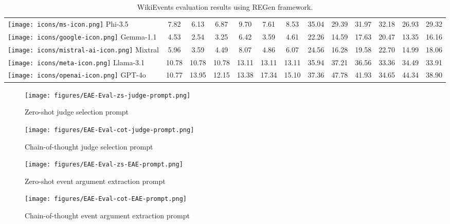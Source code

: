 \begin{table*}[h!]
\begin{tabular}{l|ccc|ccc|ccc|ccc}
\texttt{[image: icons/ms-icon.png]} Phi-3.5 & 7.82 & 6.13 & 6.87 & 9.70 & 7.61 & 8.53 & 35.04 & 29.39 & 31.97 & 32.18 & 26.93 & 29.32 \\
\texttt{[image: icons/google-icon.png]} Gemma-1.1 & 4.53 & 2.54 & 3.25 & 6.42 & 3.59 & 4.61 & 22.26 & 14.59 & 17.63 & 20.47 & 13.35 & 16.16 \\
\texttt{[image: icons/mistral-ai-icon.png]} Mixtral & 5.96 & 3.59 & 4.49 & 8.07 & 4.86 & 6.07 & 24.56 & 16.28 & 19.58 & 22.70  & 14.99 & 18.06 \\
\texttt{[image: icons/meta-icon.png]} Llama-3.1 & 10.78 & 10.78 & 10.78 & 13.11 & 13.11 & 13.11 & 35.94 & 37.21 & 36.56 & 33.36 & 34.49 & 33.91\\
\texttt{[image: icons/openai-icon.png]} GPT-4o & 10.77 & 13.95 & 12.15 & 13.38 & 17.34 & 15.10 & 37.36 & 47.78 & 41.93 & 34.65 & 44.34 & 38.90 \\

\bottomrule 
\end{tabular}
\caption{WikiEvents evaluation results using REGen framework.}
\label{WikiEvents-all-results}
\end{table*}


\begin{figure}[h!]
  \centering
  \texttt{[image: figures/EAE-Eval-zs-judge-prompt.png]}
 \caption{Zero-shot judge selection prompt}
 \label{zs-judge-prompt}
\end{figure}

\begin{figure}[t!]
  \centering
  \texttt{[image: figures/EAE-Eval-cot-judge-prompt.png]}
 \caption{Chain-of-thought judge selection prompt}
 \label{cot-judge-prompt}
\end{figure}


\begin{figure}[t!]
  \centering
  \texttt{[image: figures/EAE-Eval-zs-EAE-prompt.png]}
 \caption{Zero-shot event argument extraction prompt}
 \label{zs-EAE-prompt}
\end{figure}

\begin{figure}[t!]
  \centering
  \texttt{[image: figures/EAE-Eval-cot-EAE-prompt.png]}
 \caption{Chain-of-thought event argument extraction prompt}
 \label{cot-EAE-prompt}
\end{figure}
